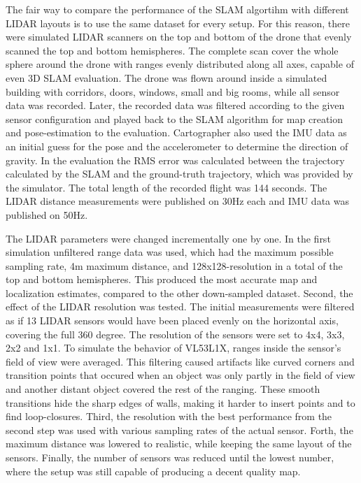 \documentclass[conference]{IEEEtran}
\begin{document}
 The fair way to compare the performance of the SLAM algortihm with different LIDAR layouts is to use the same dataset for every setup. For this reason, there were simulated LIDAR scanners on the top and bottom of the drone that evenly scanned the top and bottom hemispheres. The complete scan cover the whole sphere around the drone with ranges evenly distributed along all axes, capable of even 3D SLAM evaluation. The drone was flown around inside a simulated building with corridors, doors, windows, small and big rooms, while all sensor data was recorded. Later, the recorded data was filtered according to the given sensor configuration and  played back to the SLAM algorithm for map creation and pose-estimation to the evaluation. Cartographer also used the IMU data as an initial guess for the pose and the accelerometer to determine the direction of gravity. In the  evaluation the RMS error was calculated between the trajectory calculated by the SLAM and the ground-truth trajectory, which was provided by the simulator. The total length of the recorded flight was 144 seconds. The LIDAR distance measurements were published  on 30Hz each and IMU data was published on 50Hz. 

The LIDAR parameters were changed incrementally one by one. In the first simulation unfiltered range data was used, which had the maximum possible sampling rate, 4m maximum distance, and 128x128-resolution in a total of the top and bottom hemispheres. This produced the most accurate map and localization estimates, compared to the other down-sampled dataset. Second, the effect of the LIDAR resolution was tested. The initial measurements were filtered as if 13 LIDAR sensors would have been placed evenly on the horizontal axis, covering the full 360 degree. The resolution of the sensors were set to 4x4, 3x3, 2x2 and 1x1. To simulate the behavior of VL53L1X, ranges inside the sensor's field of view were averaged. This filtering caused artifacts like curved corners and transition points that occured when an object was only partly in the field of view and another distant object covered the rest of the ranging. These smooth transitions hide the sharp edges of walls, making it harder to insert points and to find loop-closures. Third, the resolution with the best performance from the second step was used with various sampling rates of the actual sensor. Forth, the maximum distance was lowered to realistic, while keeping the same layout of the sensors. Finally, the number of sensors was reduced until the lowest number, where the setup was still capable of producing a decent quality map. 
\end{document}
